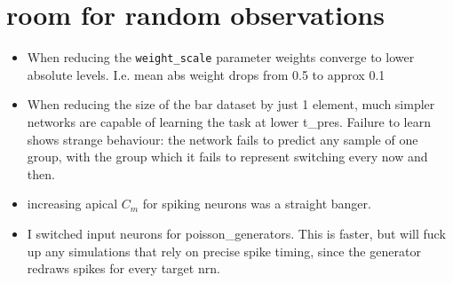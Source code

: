 \begin{figure}

\end{figure}




























\chapter{room for random observations}

\begin{itemize}
    \item When reducing the \texttt{weight\_scale} parameter weights converge to lower absolute levels. I.e. mean abs
          weight drops from 0.5 to approx 0.1
    \item When reducing the size of the bar dataset by just 1 element, much simpler networks are capable of learning the
          task at lower t\_pres. Failure to learn shows strange behaviour: the network fails to predict any sample of
          one group, with the group which it fails to represent switching every now and then.
    \item increasing apical $C_m$ for spiking neurons was a straight banger.
    \item I switched input neurons for poisson\_generators. This is faster, but will fuck up any simulations that rely
          on precise spike timing, since the generator redraws spikes for every target nrn.
\end{itemize}
